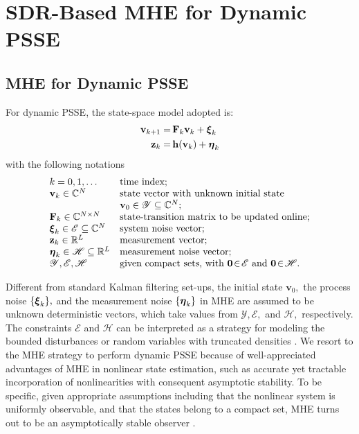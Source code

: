 \documentclass[conference]{IEEEtran}
\def\bbF{{\ensuremath{\mathbf F}}}
\def\bbh{{\ensuremath{\mathbf h}}}
\def\bbv{{\ensuremath{\mathbf v}}}
\def\bbz{{\ensuremath{\mathbf z}}}
\def\bb0{{\ensuremath{\mathbf 0}}}
\def\bbeta{{\mbox{\boldmath $\eta$}}}
\def\bbxi{{\mbox{\boldmath $\xi$}}}
\begin{document}
\section{SDR-Based MHE for Dynamic PSSE}
\label{sec4}
\subsection{MHE for Dynamic PSSE}
For dynamic PSSE, the state-space model adopted is:
\begin{subequations}
\begin{align}
\bbv_{k+1}=&\,\bbF_k{\bbv}_k+{\bbxi}_k\label{system eq}\\
\bbz_k=&\,\bbh(\bbv_k)+\bbeta_k\label{observation eq}
\end{align}
\end{subequations}
with the following notations
$$\begin{array}{ll}
k=0,1,\ldots&{\text{time~index;}}\\
{\bbv}_k\in \mathbb{C}^N&{\text{state vector~with~unknown~initial~state}}\\
&\bbv_0\in\mathscr{Y}\subseteq\mathbb{C}^N;\\
\bbF_k\in \mathbb{C}^{N\times N}&  {\text{state-transition matrix~to~be~updated~online;}}\\
{\bbxi}_k\in\mathscr{E}\subseteq\mathbb{C}^N&\text{system noise vector;}\\
\bbz_k\in\mathbb{R}^{L}&\text{measurement vector;}\\
\bbeta_k\in\mathscr{H}\subseteq\mathbb{R}^L&\text{measurement noise vector;}\\
\mathscr{Y},\mathscr{E},\mathscr{H}\!&\text{given compact sets, with }\bb0\!\in\!\mathscr{E}{\text{~and~}}\bb0\!\in\! \mathscr{H}.
\end{array}$$







Different from standard Kalman filtering set-ups, the initial state $\bbv_0,$ the process noise $\{\bbxi_k\},$ and the measurement noise $\{\bbeta_k\}$ in MHE are assumed to be unknown deterministic vectors, which take values from $\mathscr{Y},\mathscr{E},$ and $\mathscr{H},$ respectively. The constraints $\mathscr{E}$ and $\mathscr{H}$ can be interpreted as a strategy for modeling the bounded disturbances or random variables with truncated densities \cite{tac:rao2003}. We resort to the MHE strategy to perform dynamic PSSE because of well-appreciated advantages of MHE in nonlinear state estimation, such as accurate yet tractable incorporation of nonlinearities with consequent asymptotic stability. To be specific, given appropriate assumptions including that the nonlinear system is uniformly observable, and that the states belong to a compact set, MHE turns out to be an asymptotically stable observer  \cite[Prop. 3.4]{tac:rao2003}. \iffalse; see, e.g., Prop. 3.4 in \cite{tac:rao2003} for more details.\fi
\end{document}
